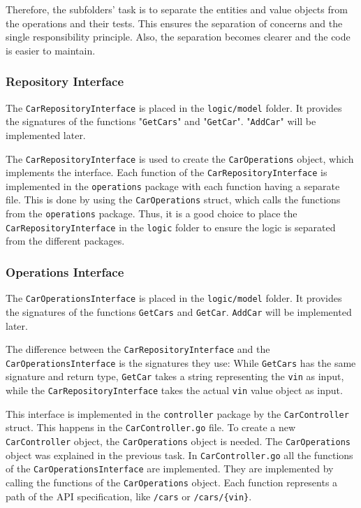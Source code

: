 Therefore, the subfolders' task is to separate the entities and value objects from the operations and their tests.
This ensures the separation of concerns and the single responsibility principle.
Also, the separation becomes clearer and the code is easier to maintain.

\subsubsection*{Repository Interface}
The \texttt{CarRepositoryInterface} is placed in the \texttt{logic/model} folder.
It provides the signatures of the functions "\texttt{GetCars}" and "\texttt{GetCar}".
"\texttt{AddCar}" will be implemented later.

The \texttt{CarRepositoryInterface} is used to create the \texttt{CarOperations} object, which implements the interface.
Each function of the \texttt{CarRepositoryInterface} is implemented in the \texttt{operations} package with each function having a separate file.
This is done by using the \texttt{CarOperations} struct, which calls the functions from the \texttt{operations} package.
Thus, it is a good choice to place the \texttt{CarRepositoryInterface} in the \texttt{logic} folder to ensure the logic is separated from the different packages.

\subsubsection*{Operations Interface}
\label{sec:operationsInterface}
The \texttt{CarOperationsInterface} is placed in the \texttt{logic/model} folder.
It provides the signatures of the functions \texttt{GetCars} and \texttt{GetCar}.
\texttt{AddCar} will be implemented later.

The difference between the \texttt{CarRepositoryInterface} and the \texttt{CarOperationsInterface} is the signatures they use:
While \texttt{GetCars} has the same signature and return type, \texttt{GetCar} takes a string representing the \texttt{vin} as input, while the \texttt{CarRepositoryInterface} takes the actual \texttt{vin} value object as input.

This interface is implemented in the \texttt{controller} package by the \texttt{CarController} struct.
This happens in the \texttt{CarController.go} file.
To create a new \texttt{CarController} object, the \texttt{CarOperations} object is needed.
The \texttt{CarOperations} object was explained in the previous task.
In \texttt{CarController.go} all the functions of the \texttt{CarOperationsInterface} are implemented.
They are implemented by calling the functions of the \texttt{CarOperations} object.
Each function represents a path of the API specification, like \texttt{/cars} or \texttt{/cars/\{vin\}}.

